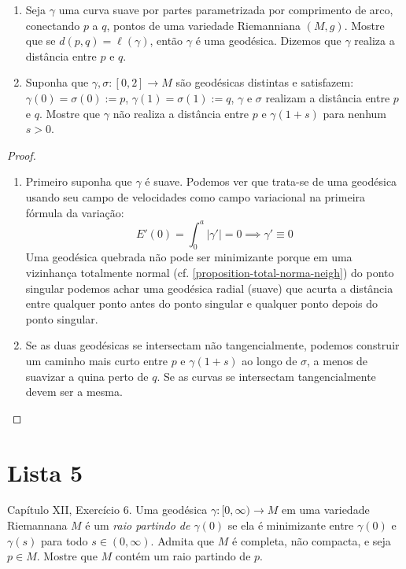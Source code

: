 \documentclass{book}
\begin{document}
\begin{exercise}
\label{exercise-curvas-minimizantes}
\begin{enumerate}
\item Seja $\gamma$ uma curva suave por
partes parametrizada por comprimento de
 arco, conectando $p$ a $q$, pontos de uma
 variedade Riemanniana $(M,g)$.
 Mostre que se $d(p,q)=\ell(\gamma)$, então
 $\gamma$ é uma geodésica.
 Dizemos que $\gamma$ realiza a distância
 entre $p$ e $q$.
\item Suponha que $\gamma,\sigma:[0,2]\to M$
são geodésicas distintas
 e satisfazem: $\gamma(0)=\sigma(0):=p$,
 $\gamma(1)=\sigma(1):=q$,
$\gamma$ e $\sigma$ realizam a distância
entre $p$ e $q$.
 Mostre que $\gamma$ não realiza a distância
 entre $p$ e $\gamma(1+s)$
para nenhum $s>0$.
\end{enumerate}
\end{exercise}

\begin{proof}
\begin{enumerate}
\item Primeiro suponha que $\gamma$ é suave.
Podemos ver que trata-se de uma
geodésica usando seu campo de velocidades
como campo variacional na primeira
fórmula da variação:
$$
E'(0)=\int_0^a |\gamma'|=0 \implies
\gamma'\equiv 0
$$
Uma geodésica quebrada não pode ser
minimizante porque em uma vizinhança
totalmente normal (cf.
\ref{proposition-total-norma-neigh})
do ponto singular podemos achar uma geodésica
radial (suave)
 que acurta a distância entre qualquer ponto
 antes do ponto singular
 e qualquer ponto depois do ponto singular.
\item Se as duas geodésicas se intersectam
não tangencialmente, podemos
construir um caminho mais curto entre $p$ e
$\gamma(1+s)$ ao longo de $\sigma$,
a menos de suavizar a quina perto de $q$. Se
as curvas se intersectam
 tangencialmente devem ser a mesma.
\end{enumerate}
\end{proof}

\section{Lista 5}
\label{section-lista-5}

\begin{exercise}
\label{exercise-l5-5}
\cite{doc} Capítulo XII, Exercício 6. Uma
geodésica $\gamma:[0,\infty)\to M$ em
uma variedade Riemannana $M$ é um {\it raio
partindo de $\gamma(0)$} se ela é
minimizante entre $\gamma(0)$ e $\gamma(s)$
para todo  $s \in (0,\infty)$.
Admita que $M$ é completa, não compacta, e
seja $p \in M$. Mostre que $M$ contém
um raio partindo de $p$.
\end{exercise}
\end{document}
